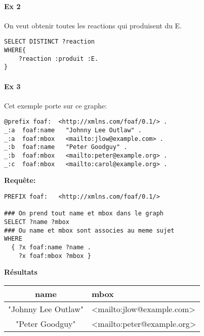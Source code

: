 \documentclass[11pt,a4paper]{article}
\begin{document}
\paragraph{Ex 2}
On veut obtenir toutes les reactions qui produisent du E.
\begin{lstlisting}
SELECT DISTINCT ?reaction
WHERE{
    ?reaction :produit :E.
}
\end{lstlisting}

\paragraph{Ex 3}
Cet exemple porte sur ce graphe:
\begin{lstlisting}
@prefix foaf:  <http://xmlns.com/foaf/0.1/> .
_:a  foaf:name   "Johnny Lee Outlaw" .
_:a  foaf:mbox   <mailto:jlow@example.com> .
_:b  foaf:name   "Peter Goodguy" .
_:b  foaf:mbox   <mailto:peter@example.org> .
_:c  foaf:mbox   <mailto:carol@example.org> .
\end{lstlisting}
\vspace{10pt}
\textbf{Requête:}
\begin{lstlisting}
PREFIX foaf:   <http://xmlns.com/foaf/0.1/>

### On prend tout name et mbox dans le graph
SELECT ?name ?mbox
### Ou name et mbox sont associes au meme sujet
WHERE
  { ?x foaf:name ?name .
    ?x foaf:mbox ?mbox }
\end{lstlisting}


\vspace{5pt}
\textbf{Résultats}
\begin{tabular}{c | l}
name & mbox \\
\hline
"Johnny Lee Outlaw" & <mailto:jlow@example.com>\\
"Peter Goodguy" & <mailto:peter@example.org>\\
\end{tabular}
\end{document}
